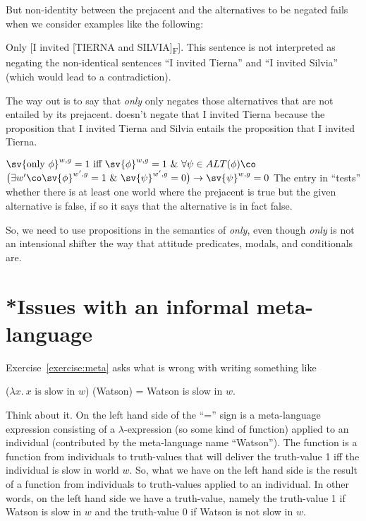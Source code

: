 But non-identity between the prejacent and the alternatives to be negated fails
when we consider examples like the following:

\ex Only [I invited [TIERNA and SILVIA]\textsubscript{F}]. \xe
%
This sentence is not interpreted as negating the non-identical sentences ``I
invited Tierna'' and ``I invited Silvia'' (which would lead to a contradiction).

The way out is to say that \emph{only} only negates those alternatives that are
not entailed by its prejacent. \Last doesn't negate that I invited Tierna
because the proposition that I invited Tierna and Silvia entails the proposition
that I invited Tierna.

\ex $\sv{\text{only}\ \phi}^{w,g} = 1 \text{ iff } \sv{\phi}^{w,g} = 1\ \&\ \forall
\psi\in ALT(\phi)\co$ \\[-8pt]
\null\hfill$\bigl(\exists w'\co \sv{\phi}^{w',g} = 1\ \&\ \sv{\psi}^{w',g} = 0\bigr) \rightarrow \sv{\psi}^{w,g} = 0$
\xe
%
The entry in \Last ``tests'' whether there is at least one world where the
prejacent is true but the given alternative is false, if so it says that the
alternative is in fact false.

%
So, we need to use propositions in the semantics of \emph{only}, even though
\emph{only} is not an intensional shifter the way that attitude predicates,
modals, and conditionals are.

\clearpage
\section{*Issues with an informal meta-language}
\label{sec:meta-issues}

Exercise~\ref{exercise:meta} asks what is wrong with writing something like%
%

\ex ($\lambda x.\ x \mbox{ is slow in } w$) (Watson) = Watson is slow
in $w$.\label{ex:badwatson} \xe

Think about it. On the left hand side of the ``='' sign is a meta-language
expression consisting of a $\lambda$-expression (so some kind of function)
applied to an individual (contributed by the meta-language name ``Watson''). The
function is a function from individuals to truth-values that will deliver the
truth-value 1 iff the individual is slow in world $w$. So, what we have on the
left hand side is the result of a function from individuals to truth-values
applied to an individual. In other words, on the left hand side we have a
truth-value, namely the truth-value 1 if Watson is slow in $w$ and the
truth-value 0 if Watson is not slow in $w$.

